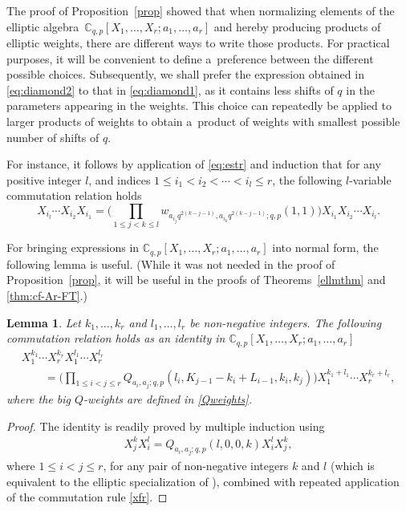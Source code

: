 \documentclass[pdftex]{sigma}
\numberwithin{equation}{section}
\newtheorem{Lemma}[Theorem]{Lemma}
\theoremstyle{definition}
\newcommand{\C}{\mathbb C}
\begin{document}
The proof of Proposition~\ref{prop} showed that
when normalizing elements of the elliptic algebra~${\C_{q,p}[X_1,\dots,X_r;a_1,\dots,a_r]}$ and hereby
producing products of elliptic weights,
there are different ways to write those products.
For practical purposes, it will be convenient to define a~preference
between the different possible choices. Subsequently, we shall
prefer the expression obtained in \eqref{eq:diamond2}
to that in \eqref{eq:diamond1},
as it contains less shifts of $q$ in the parameters appearing in the weights.
This choice can repeatedly be applied to larger products of weights to
obtain a~product of weights with smallest possible number of shifts of $q$.

For instance, it follows by application of \eqref{eq:estr} and induction
that for any positive integer $l$,
and indices $1\le i_1<i_2<\cdots<i_l\le r$,
the following $l$-variable commutation relation holds
\[%
X_{i_{l}}\cdots X_{i_2}X_{i_1}
=\bigg(\prod_{1\le j<k\le l}w_{a_{i_j}q^{2(k-j-1)},a_{i_k}q^{2(k-j-1)};q,p}(1,1)\bigg)
X_{i_1}X_{i_2}\cdots X_{i_{l}}.
\]


For bringing expressions in
$\C_{q,p}[X_1,\dots,X_r;a_1,\dots,a_r]$
into normal form, the following lemma is useful. (While it was not needed
in the proof of Proposition~\ref{prop}, it will be useful in the proofs
of Theorems~\ref{ellmthm} and \ref{thm:cf-Ar-FT}.)

\begin{Lemma}\label{lem:com}
Let $k_1,\dots,k_r$ and $l_1,\dots,l_r$ be non-negative integers.
The following commutation relation holds as an identity in
$\C_{q,p}[X_1,\dots,X_r;a_1,\dots,a_r]$
\begin{gather*}
X_1^{k_1}\cdots X_r^{k_r}X_1^{l_1}\cdots X_r^{l_r}\\
\qquad
=\bigg(\prod_{1\le i<j\le r}Q_{a_i,a_j;q,p}(l_i,K_{j-1}-k_i+L_{i-1},k_i,k_j)\bigg)
X_1^{k_1+l_1}\cdots X_r^{k_r+l_r},
\end{gather*}
where the big $Q$-weights are defined in \eqref{Qweights}.
\end{Lemma}
\begin{proof}
The identity is readily proved by multiple induction using
\begin{gather*}%
X_j^{k}X_i^{l}=Q_{a_i,a_j;q,p}(l,0,0,k) X_i^{l}X_j^k,
\end{gather*}
where $1\le i<j\le r$, for any pair of non-negative integers $k$ and $l$
(which is equivalent to the elliptic specialization of \cite[Lemma~1]{S1}),
combined with repeated application of the commutation rule \eqref{xfr}.
\end{proof}
\end{document}
